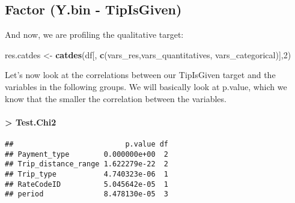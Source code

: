 \documentclass[
  18pt,
  a4paper]{article}
\newenvironment{Shaded}{\begin{snugshade}}{\end{snugshade}}
\newcommand{\DecValTok}[1]{\textcolor[rgb]{0.00,0.00,0.81}{#1}}
\newcommand{\KeywordTok}[1]{\textcolor[rgb]{0.13,0.29,0.53}{\textbf{#1}}}
\newcommand{\NormalTok}[1]{#1}
\newcommand{\OperatorTok}[1]{\textcolor[rgb]{0.81,0.36,0.00}{\textbf{#1}}}
\newcommand{\StringTok}[1]{\textcolor[rgb]{0.31,0.60,0.02}{#1}}
\begin{document}
\hypertarget{factor-y.bin---tipisgiven}{%
\subsection{Factor (Y.bin -
TipIsGiven)}\label{factor-y.bin---tipisgiven}}

And now, we are profiling the qualitative target:

\begin{Shaded}
\begin{Highlighting}[]
\NormalTok{res.catdes <-}\StringTok{ }\KeywordTok{catdes}\NormalTok{(df[, }\KeywordTok{c}\NormalTok{(vars_res,vars_quantitatives, vars_categorical)],}\DecValTok{2}\NormalTok{)}
\end{Highlighting}
\end{Shaded}

Let's now look at the correlations between our TipIsGiven target and the
variables in the following groups. We will basically look at p.value,
which we know that the smaller the correlation between the variables.

\hypertarget{test.chi2}{%
\paragraph{\textgreater{} Test.Chi2}\label{test.chi2}}

\begin{Shaded}
\end{Shaded}

\begin{verbatim}
##                          p.value df
## Payment_type        0.000000e+00  2
## Trip_distance_range 1.622279e-22  2
## Trip_type           4.740323e-06  1
## RateCodeID          5.045642e-05  1
## period              8.478130e-05  3
\end{verbatim}
\end{document}
